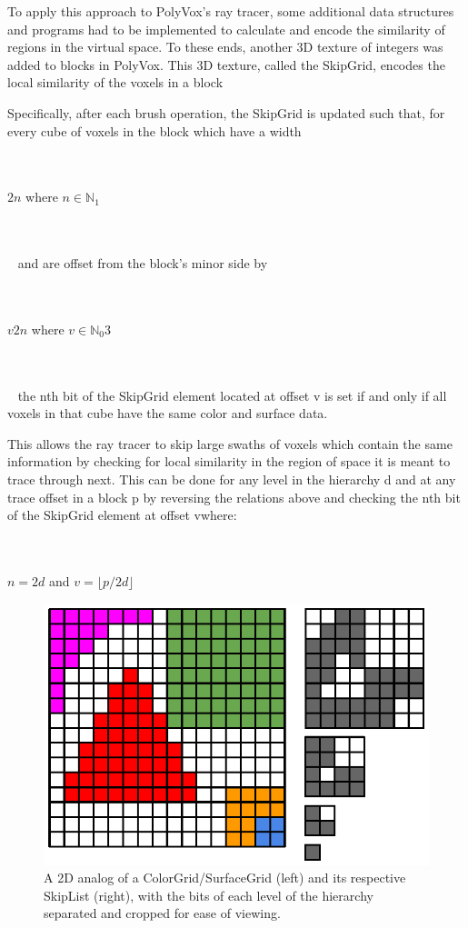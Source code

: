 \documentclass[onecolumn, draftclsnofoot,10pt, compsoc]{IEEEtran}
\begin{document}
To apply this approach to PolyVox’s ray tracer, some additional data structures and programs had to be implemented to calculate and encode the similarity of regions in the virtual space. To these ends, another 3D texture of integers was added to blocks in PolyVox. This 3D texture, called the SkipGrid, encodes the local similarity of the voxels in a block

Specifically, after each brush operation, the SkipGrid is updated such that, for every cube of voxels in the block which have a width
\\~
\\~
\centerline{$ 2n $   where    $ n \in \mathbb{N}_1 $}
\\~
\\~
and are offset from the block’s minor side by
\\~
\\~
\centerline{$v2n$   where   $v \in \mathbb{N}_0 3$}
\\~
\\~
the nth bit of the SkipGrid element located at offset v is set if and only if all voxels in that cube have the same color and surface data.

This allows the ray tracer to skip large swaths of voxels which contain the same information by checking for local similarity in the region of space it is meant to trace through next. This can be done for any level in the hierarchy d and at any trace offset in a block p by reversing the relations above and checking the nth bit of the SkipGrid element at offset vwhere:
\\~
\\~
\centerline{$n = 2d$    and  $v = \lfloor p / 2d \rfloor $}
\begin{figure}[h]
\centering
\includegraphics[scale=1.75]{SkipGrid.eps}
\caption{A 2D analog of a ColorGrid/SurfaceGrid (left) and its respective SkipList (right), with the bits of each level of the hierarchy separated and cropped for ease of viewing.}
\end{figure}
\end{document}
